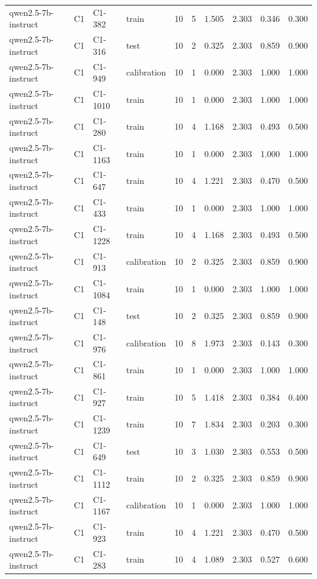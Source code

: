 \begin{table}
\begin{tabular}{llllrrrrrr}
qwen2.5-7b-instruct & C1 & C1-382 & train & 10 & 5 & 1.505 & 2.303 & 0.346 & 0.300 \\
qwen2.5-7b-instruct & C1 & C1-316 & test & 10 & 2 & 0.325 & 2.303 & 0.859 & 0.900 \\
qwen2.5-7b-instruct & C1 & C1-949 & calibration & 10 & 1 & 0.000 & 2.303 & 1.000 & 1.000 \\
qwen2.5-7b-instruct & C1 & C1-1010 & train & 10 & 1 & 0.000 & 2.303 & 1.000 & 1.000 \\
qwen2.5-7b-instruct & C1 & C1-280 & train & 10 & 4 & 1.168 & 2.303 & 0.493 & 0.500 \\
qwen2.5-7b-instruct & C1 & C1-1163 & train & 10 & 1 & 0.000 & 2.303 & 1.000 & 1.000 \\
qwen2.5-7b-instruct & C1 & C1-647 & train & 10 & 4 & 1.221 & 2.303 & 0.470 & 0.500 \\
qwen2.5-7b-instruct & C1 & C1-433 & train & 10 & 1 & 0.000 & 2.303 & 1.000 & 1.000 \\
qwen2.5-7b-instruct & C1 & C1-1228 & train & 10 & 4 & 1.168 & 2.303 & 0.493 & 0.500 \\
qwen2.5-7b-instruct & C1 & C1-913 & calibration & 10 & 2 & 0.325 & 2.303 & 0.859 & 0.900 \\
qwen2.5-7b-instruct & C1 & C1-1084 & train & 10 & 1 & 0.000 & 2.303 & 1.000 & 1.000 \\
qwen2.5-7b-instruct & C1 & C1-148 & test & 10 & 2 & 0.325 & 2.303 & 0.859 & 0.900 \\
qwen2.5-7b-instruct & C1 & C1-976 & calibration & 10 & 8 & 1.973 & 2.303 & 0.143 & 0.300 \\
qwen2.5-7b-instruct & C1 & C1-861 & train & 10 & 1 & 0.000 & 2.303 & 1.000 & 1.000 \\
qwen2.5-7b-instruct & C1 & C1-927 & train & 10 & 5 & 1.418 & 2.303 & 0.384 & 0.400 \\
qwen2.5-7b-instruct & C1 & C1-1239 & train & 10 & 7 & 1.834 & 2.303 & 0.203 & 0.300 \\
qwen2.5-7b-instruct & C1 & C1-649 & test & 10 & 3 & 1.030 & 2.303 & 0.553 & 0.500 \\
qwen2.5-7b-instruct & C1 & C1-1112 & train & 10 & 2 & 0.325 & 2.303 & 0.859 & 0.900 \\
qwen2.5-7b-instruct & C1 & C1-1167 & calibration & 10 & 1 & 0.000 & 2.303 & 1.000 & 1.000 \\
qwen2.5-7b-instruct & C1 & C1-923 & train & 10 & 4 & 1.221 & 2.303 & 0.470 & 0.500 \\
qwen2.5-7b-instruct & C1 & C1-283 & train & 10 & 4 & 1.089 & 2.303 & 0.527 & 0.600 \\

\end{tabular}
\end{table}

